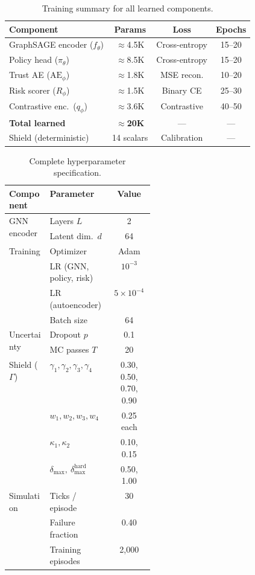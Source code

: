 \documentclass[lettersize,journal]{IEEEtran}
\begin{document}
\begin{table}[t]
\centering
\caption{Training summary for all learned components.}
\label{tab:training_summary}
\begin{tabular}{lccc}
\toprule
Component & Params & Loss & Epochs \\
\midrule
GraphSAGE encoder ($f_\theta$) & $\approx$4.5K & Cross-entropy & 15--20 \\
Policy head ($\pi_\theta$) & $\approx$8.5K & Cross-entropy & 15--20 \\
Trust AE ($\mathrm{AE}_\phi$) & $\approx$1.8K & MSE recon. & 10--20 \\
Risk scorer ($R_\phi$) & $\approx$1.5K & Binary CE & 25--30 \\
Contrastive enc.\ ($q_\phi$) & $\approx$3.6K & Contrastive & 40--50 \\
\midrule
\textbf{Total learned} & $\approx$\textbf{20K} & --- & --- \\
Shield (deterministic) & 14 scalars & Calibration & --- \\
\bottomrule
\end{tabular}
\end{table}


\begin{table}[t]
\centering
\caption{Complete hyperparameter specification.}
\label{tab:hyperparameters}
\footnotesize
\begin{tabular}{p{0.28\linewidth}lc}
\toprule
Component & Parameter & Value \\
\midrule
\multirow{2}{*}{GNN encoder}
  & Layers $L$ & 2 \\
  & Latent dim.\ $d$ & 64 \\
\midrule
\multirow{4}{*}{Training}
  & Optimizer & Adam \\
  & LR (GNN, policy, risk) & $10^{-3}$ \\
  & LR (autoencoder) & $5\!\times\!10^{-4}$ \\
  & Batch size & 64 \\
\midrule
\multirow{2}{*}{Uncertainty}
  & Dropout $p$ & 0.1 \\
  & MC passes $T$ & 20 \\
\midrule
\multirow{4}{*}{Shield ($\Gamma$)}
  & $\gamma_1,\gamma_2,\gamma_3,\gamma_4$ & 0.30, 0.50, 0.70, 0.90 \\
  & $w_1,w_2,w_3,w_4$ & 0.25 each \\
  & $\kappa_1, \kappa_2$ & 0.10, 0.15 \\
  & $\delta_{\max},\ \delta_{\max}^{\mathrm{hard}}$ & 0.50, 1.00 \\
\midrule
\multirow{3}{*}{Simulation}
  & Ticks / episode & 30 \\
  & Failure fraction & 0.40 \\
  & Training episodes & 2,000 \\
\bottomrule
\end{tabular}
\end{table}
\end{document}
